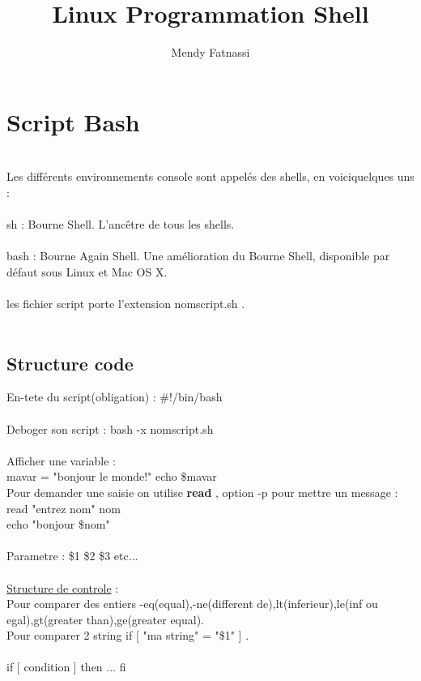 \documentclass[a4paper,12pt]{book}
\author{Mendy Fatnassi}
\title{Linux Programmation Shell}
\begin{document}
\maketitle
\chapter{Script Bash}
\\
Les différents environnements console sont appelés des shells, en voiciquelques uns :\\
\\
sh : Bourne Shell. L'ancêtre de tous les shells.\\
\\
bash : Bourne Again Shell. Une amélioration du Bourne Shell, disponible par défaut sous Linux et Mac OS X.\\
\\
les fichier script porte l'extension nomscript.sh .\\
\\
\section{Structure code}
En-tete du script(obligation) : #!/bin/bash\\
\\
Deboger son script : bash -x nomscript.sh\\
\\
Afficher une variable : \\
mavar = "bonjour le monde!"
echo \$mavar
\\
Pour demander une saisie on utilise \textbf{read} , option -p pour mettre un message : \\
read "entrez nom" nom \\
echo "bonjour \$nom" \\
\\
Parametre : \$1 \$2 \$3 etc...\\
\\
\underline{Structure de controle} :\\
Pour comparer des entiers -eq(equal),-ne(different de),lt(inferieur),le(inf ou egal),gt(greater than),ge(greater equal).\\
Pour comparer 2 string if [ "ma string" = "\$1" ] .\\
\\
if [ condition ]
then
...
fi
\end{document}
